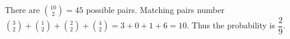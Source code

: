 There are $\binom{10}{2}=45 $ possible pairs. Matching pairs number $\binom32+\binom12+\binom22+\binom42=3+0+1+6=10 $. Thus the probability is $\boxed{\dfrac{2}{9}}$.
